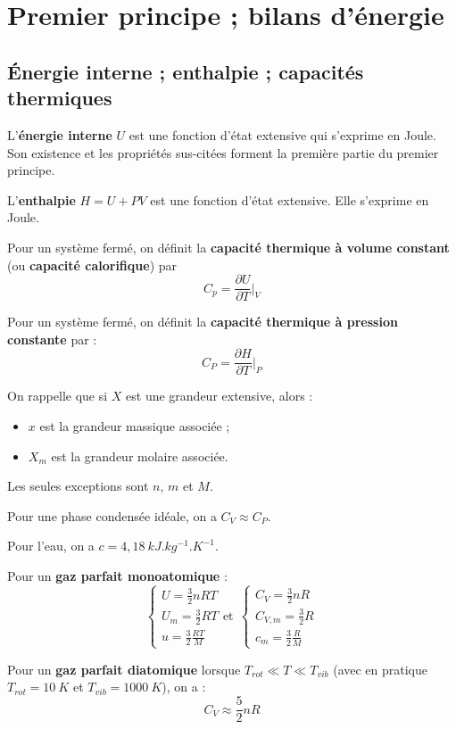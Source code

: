 \documentclass[french]{book}
\theoremstyle{plain}
\theoremstyle{definition}
\theoremstyle{remark}
\newcommand{\inv}{^{-1}}
\begin{document}
\section{Premier principe ; bilans d'énergie}
\subsection{Énergie interne ; enthalpie ; capacités thermiques}
L'\textbf{énergie interne} $U$ est une fonction d'état extensive qui s'exprime en Joule. Son existence et les propriétés sus-citées forment la première partie du premier principe. \\ \par L'\textbf{enthalpie} $H=U+PV$ est une fonction d'état extensive. Elle s'exprime en Joule. \\ \par Pour un système fermé, on définit la \textbf{capacité thermique à volume constant} (ou \textbf{capacité calorifique}) par $$C_p=\frac{\partial U}{\partial T}\bigg\rvert_V$$ \par Pour un système fermé, on définit la \textbf{capacité thermique à pression constante} par : $$C_P=\frac{\partial H}{\partial T}\bigg\rvert_P$$ \par On rappelle que si $X$ est une grandeur extensive, alors : 
\begin{itemize}
	\item $x$ est la grandeur massique associée ;
	\item $X_m$ est la grandeur molaire associée.
\end{itemize}
Les seules exceptions sont $n$, $m$ et $M$. \\ \par Pour une phase condensée idéale, on a $C_V\approx C_P$. \\ \par Pour l'eau, on a $c=4,18 \ kJ.kg\inv.K\inv$. \\ \par Pour un \textbf{gaz parfait monoatomique} : $$\begin{cases}
	U=\displaystyle\frac32nRT \\[2mm] U_m=\displaystyle\frac32RT \\[2mm] u=\displaystyle\frac32\frac{RT}{M}
\end{cases} \text{et} \ \ \begin{cases}
C_V=\displaystyle\frac32nR \\[2mm] C_{V,m}=\displaystyle\frac32R \\[2mm] c_m=\displaystyle\frac32\frac{R}{M}
\end{cases}$$ \par Pour un \textbf{gaz parfait diatomique} lorsque $T_{rot}\ll T\ll T_{vib}$ (avec en pratique $T_{rot}=10 \ K$ et $T_{vib}=1000\ K$), on a : $$C_V\approx\frac{5}{2}nR$$ \par
\end{document}

